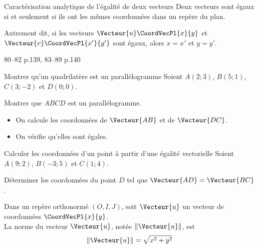 \documentclass[a4paper]{article}
\begin{document}
\begin{proprieteadm}{Caractérisation analytique de l'égalité de deux vecteurs}{}
  Deux vecteurs sont égaux si et seulement si ils ont les mêmes coordonnées dans un repère du plan.

  Autrement dit, si les vecteurs $\Vecteur{u}\CoordVecPl{x}{y}$ et $\Vecteur{v}\CoordVecPl{x'}{y'}$ sont égaux, alors 
  $x=x'$ et $y=y'$.
\end{proprieteadm}

\begin{exercices}{}{}
  80--82 p.139, 83--89 p.140
\end{exercices}

\begin{methode*}{Montrer qu'un quadrilatère est un parallélogramme}{}
  Soient $A(2;3)$, $B(5;1)$, $C(3;-2)$ et $D(0;0)$.
  
  Montrer que $ABCD$ est un parallélogramme.

  \begin{itemize}
    \item On calcule les coordonnées de $\Vecteur{AB}$ et de $\Vecteur{DC}$.
    \vspace{2cm}
    \item On vérifie qu'elles sont égales. 
    \vspace{2cm}
  \end{itemize}



\end{methode*}

\begin{methode*}{Calculer les coordonnées d'un point à partir d'une égalité vectorielle}{}
  Soient $A(9;2)$, $B(-3;5)$ et $C(1;4)$.

  Déterminer les coordonnées du point $D$ tel que $\Vecteur{AD}=\Vecteur{BC}$.

  \vspace{6cm}

  \hfill{}
  
\end{methode*}

\begin{definition}{}{}
  Dans un repère orthonormé $(O,I,J)$, soit $\Vecteur{u}$ un vecteur de coordonnées $\CoordVecPl{x}{y}$.\\
  La norme du vecteur $\Vecteur{u}$, notée $ \left\lVert \Vecteur{u} \right\rVert$, est 
  $$ \left\lVert \Vecteur{u} \right\rVert = \sqrt{x^2+y^2} $$ 
\end{definition}
\end{document}
